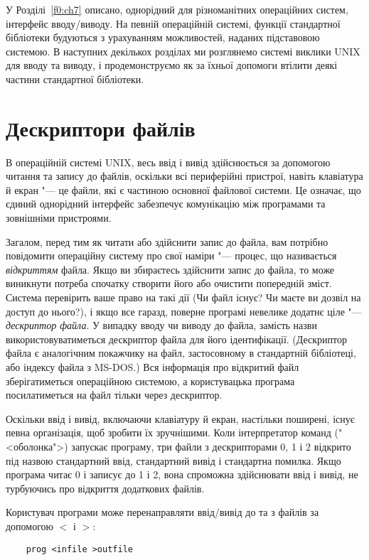 \documentclass[a4paper,12pt]{book}
\begin{document}
  У Розділі~\ref{f0:ch7} описано, однорідний для різноманітних операційних систем,
  інтерфейс вводу/виводу. На певній операційній системі, функції стандартної бібліотеки
  будуються з урахуванням можливостей, наданих підставовою системою. В наступних
  декількох розділах ми розглянемо системі виклики UNIX для вводу та виводу, і
  продемонструємо як за їхньої допомоги втілити деякі частини стандартної бібліотеки.

\section{Дескриптори файлів}


  В операційній системі UNIX, весь ввід і вивід здійснюється за допомогою читання та
  запису до файлів, оскільки всі периферійні пристрої, навіть клавіатура й екран "---
  це файли, які є частиною основної файлової системи. Це означає, що єдиний
  однорідний інтерфейс забезпечує комунікацію між програмами та зовнішніми пристроями.

  Загалом, перед тим як читати або здійснити запис до файла, вам потрібно повідомити
  операційну систему про свої наміри "--- процес, що називається \textit{відкриттям}
  файла. Якщо ви збираєтесь здійснити запис до файла, то може виникнути потреба спочатку
  створити його або очистити попередній зміст. Система перевірить ваше право на такі дії
  (Чи файл існує? Чи маєте ви дозвіл на доступ до нього?), і якщо все гаразд, поверне
  програмі невелике додатнє ціле "--- \textit{дескриптор файла}. У випадку вводу чи
  виводу до файла, замість назви використовуватиметься дескриптор файла для його
  ідентифікації. (Дескриптор файла є аналогічним покажчику на файл, застосовному в
  стандартній бібліотеці, або індексу файла з MS-DOS.) Вся інформація про відкритий файл
  зберігатиметься операційною системою, а користувацька програма посилатиметься на файл
  тільки через дескриптор.

  Оскільки ввід і вивід, включаючи клавіатуру й екран, настільки поширені, існує певна
  організація, щоб зробити їх зручнішими. Коли інтерпретатор команд
  ("<оболонка">) запускає програму, три файли з дескрипторами 0, 1 і 2 відкрито
  під назвою стандартний ввід, стандартний вивід і стандартна помилка. Якщо програма читає
  0 і записує до 1 і 2, вона спроможна здійснювати ввід і вивід, не турбуючись про
  відкриття додаткових файлів.

  Користувач програми може перенаправляти ввід/вивід до та з файлів за допомогою
  \texttt{\mbox{$<$}} і \texttt{\mbox{$>$}}:
  \begin{verbatim}
    prog <infile >outfile
  \end{verbatim}
\end{document}
